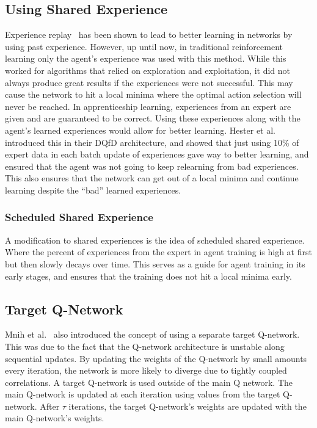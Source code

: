 \documentclass[12pt,american]{report}
\begin{document}
\subsection{Using Shared Experience}
Experience replay~\cite{atari} has been shown to lead to better learning in networks by using past experience.  However, up until now, in traditional reinforcement learning only the agent's experience was used with this method.  While this worked for algorithms that relied on exploration and exploitation, it did not always produce great results if the experiences were not successful. This may cause the network to hit a local minima where the optimal action selection will never be reached. In apprenticeship learning, experiences from an expert are given and are guaranteed to be correct.  Using these experiences along with the agent's learned experiences would allow for better learning.  Hester et al.~\cite{hester2017learning} introduced this in their DQfD architecture, and showed that just using 10\% of expert data in each batch update of experiences gave way to better learning, and ensured that the agent was not going to keep relearning from bad experiences.  This also ensures that the network can get out of a local minima and continue learning despite the ``bad'' learned experiences.
\subsubsection{Scheduled Shared Experience}
A modification to shared experiences is the idea of scheduled shared experience.  Where the percent of experiences from the expert in agent training is high at first but then slowly decays over time.  This serves as a guide for agent training in its early stages, and ensures that the training does not hit a local minima early. 


\subsection{Target Q-Network}
Mnih et al.~\cite{atari} also introduced the concept of using a separate target Q-network.  This was due to the fact that the Q-network architecture is unstable along sequential updates.  By updating the weights of the Q-network by small amounts every iteration, the network is more likely to diverge due to tightly coupled correlations.  A target Q-network is used outside of the main Q network.  The main Q-network is updated at each iteration using values from the target Q-network.  After $\tau$ iterations, the target Q-network's weights are updated with the main Q-network's weights. 
\end{document}
